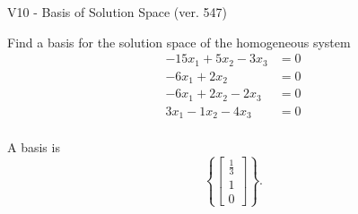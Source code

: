 \begin{exercise}
  \begin{exerciseTitle}V10 - Basis of Solution Space (ver. 547)\end{exerciseTitle}
  \begin{exerciseStatement}
    Find a basis for the solution space of the homogeneous system 
\begin{align*}
 -15 x_ 1 + 5 x_ 2 -3 x_ 3 &= 0  \\ 
  -6 x_ 1 + 2 x_ 2 &= 0  \\ 
  -6 x_ 1 + 2 x_ 2 -2 x_ 3 &= 0  \\ 
  3 x_ 1 -1 x_ 2 -4 x_ 3 &= 0  \\ 
 \end{align*}


 
  \end{exerciseStatement}

  \begin{exerciseAnswer}
   A basis is   
\[\left\{\left[\begin{array}{c}
\frac{1}{3} \\
1 \\
0
\end{array}\right]\right\}.\]

  


  \end{exerciseAnswer}
\end{exercise}